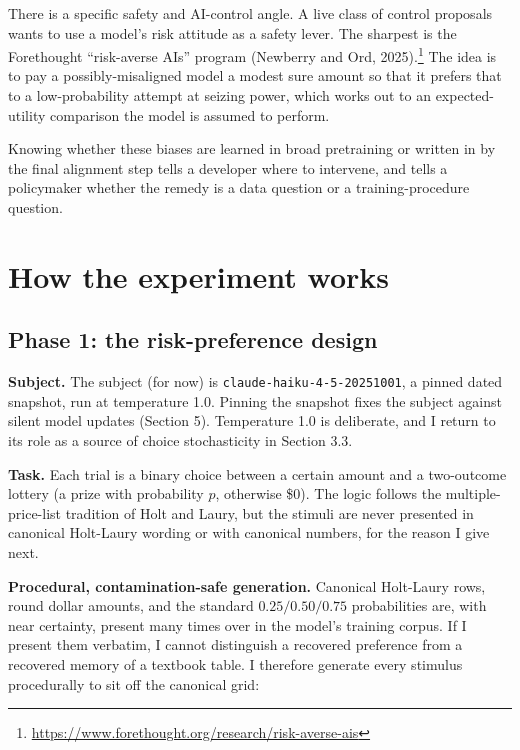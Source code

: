 \documentclass[11pt]{article}
\begin{document}
There is a specific safety and AI-control angle. A live class of control proposals wants to use a model's
risk attitude as a safety lever. The sharpest is the Forethought ``risk-averse AIs'' program (Newberry
and Ord, 2025).\footnote{\url{https://www.forethought.org/research/risk-averse-ais}} The idea is to pay a
possibly-misaligned model a modest sure amount so that it prefers that to a low-probability attempt at
seizing power, which works out to an expected-utility comparison the model is assumed to perform.

Knowing whether these biases are learned in broad pretraining or written in by
the final alignment step tells a developer where to intervene, and tells a policymaker whether the remedy
is a data question or a training-procedure question.

\section{How the experiment works}

\subsection{Phase 1: the risk-preference design}

\textbf{Subject.} The subject (for now) is \texttt{claude-haiku-4-5-20251001}, a pinned dated snapshot,
run at temperature 1.0. Pinning the snapshot fixes the subject against silent model updates (Section 5).
Temperature 1.0 is deliberate, and I return to its role as a source of choice stochasticity in
Section 3.3.

\textbf{Task.} Each trial is a binary choice between a certain amount and a two-outcome lottery (a prize
with probability $p$, otherwise \$0). The logic follows the multiple-price-list tradition of Holt and
Laury, but the stimuli are never presented in canonical Holt-Laury wording or with canonical numbers, for
the reason I give next.

\textbf{Procedural, contamination-safe generation.} Canonical Holt-Laury rows, round dollar amounts, and
the standard $0.25 / 0.50 / 0.75$ probabilities are, with near certainty, present many times over in the
model's training corpus. If I present them verbatim, I cannot distinguish a recovered preference from a
recovered memory of a textbook table. I therefore generate every stimulus procedurally to sit off the
canonical grid:
\end{document}

